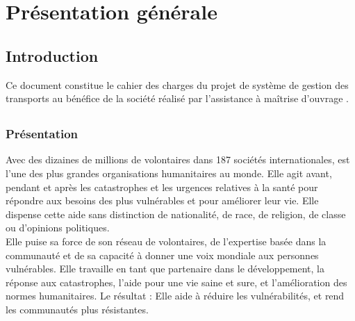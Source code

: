 \chapter{Présentation générale}
\section{Introduction}
Ce document constitue le cahier des charges du projet de système de gestion des transports au bénéfice de la société \mo réalisé par l'assistance à maîtrise d'ouvrage \amo.

\section{\mo}
\subsection{Présentation}
Avec des dizaines de millions de volontaires dans 187 sociétés internationales, \mo est l'une des plus grandes organisations humanitaires au monde. Elle agit avant, pendant et après les catastrophes et les urgences relatives à la santé pour répondre aux besoins des plus vulnérables et pour améliorer leur vie. Elle dispense cette aide sans distinction de nationalité, de race, de religion, de classe ou d'opinions politiques.
\\
Elle puise sa force de son réseau de volontaires, de l'expertise basée dans la communauté et de sa capacité à donner une voix mondiale aux personnes vulnérables. Elle travaille en tant que partenaire dans le développement, la réponse aux catastrophes, l'aide pour une vie saine et sure, et l'amélioration des normes humanitaires. Le résultat : Elle aide à réduire les vulnérabilités, et rend les communautés plus résistantes.

